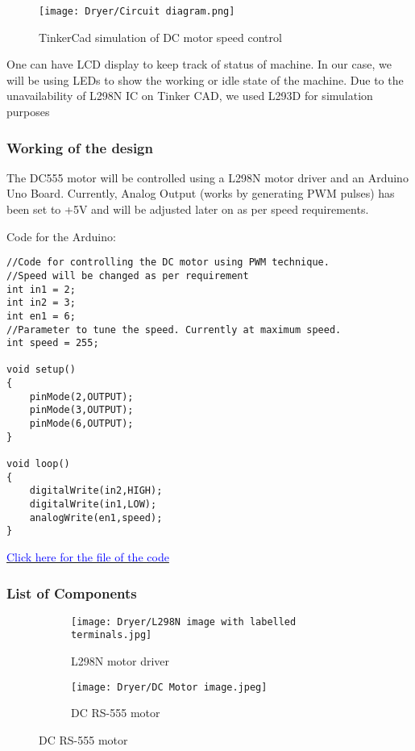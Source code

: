 \documentclass[table,french,english]{rapportCS}
\begin{document}
\begin{figure}[h]
\texttt{[image: Dryer/Circuit diagram.png]}
\caption{TinkerCad simulation of DC motor speed control}
\end{figure}

One can have LCD display to keep track of status of machine. In our case, we will be using LEDs to show the working or idle state of the machine.
Due to the unavailability of L298N IC on Tinker CAD, we used L293D for simulation purposes

\subsubsection{Working of the design}
The DC555 motor will be controlled using a L298N motor driver and an Arduino Uno Board. Currently, Analog Output (works by generating PWM pulses) has been set to +5V and will be adjusted later on as per speed requirements.

\newpage
\vspace{1cm}
Code for the Arduino:
\begin{lstlisting}
//Code for controlling the DC motor using PWM technique.
//Speed will be changed as per requirement
int in1 = 2;
int in2 = 3;
int en1 = 6;
//Parameter to tune the speed. Currently at maximum speed.
int speed = 255;    

void setup()
{
    pinMode(2,OUTPUT);
    pinMode(3,OUTPUT);
    pinMode(6,OUTPUT);
}

void loop()
{
    digitalWrite(in2,HIGH);
    digitalWrite(in1,LOW);
    analogWrite(en1,speed);
}
\end{lstlisting}

\href{https://github.com/naunidhsingh03/ELP305-Tribe-D/blob/e4d3b18690b7721a51bceab40a3f5406c65829d6/Codes/DryerControl.ino}{\textcolor{blue}{Click here for the file of the code}}

\subsubsection{List of Components}

\begin{figure}[h]
    \begin{subfigure}{0.4\textwidth}
        \centering
        \texttt{[image: Dryer/L298N image with labelled terminals.jpg]}
        \caption{L298N motor driver}
        \label{fig:enter-label}
    \end{subfigure}
    \begin{subfigure}{0.3\textwidth}
        \centering
        \texttt{[image: Dryer/DC Motor image.jpeg]}
        \caption{DC RS-555 motor}
        \label{fig:enter-label}
    \end{subfigure}
\end{figure}
\end{document}

